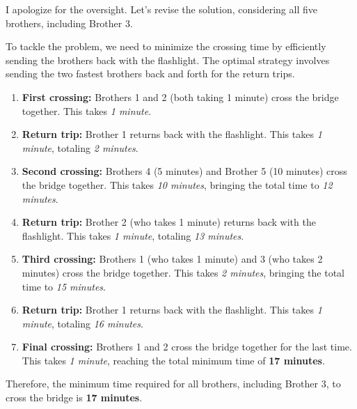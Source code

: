 \begin{airesult}
I apologize for the oversight. Let's revise the solution, considering all five
brothers, including Brother 3.

\vsp

To tackle the problem, we need to minimize the crossing time by efficiently
sending the brothers back with the flashlight. The optimal strategy involves
sending the two fastest brothers back and forth for the return trips.

\vsp

\begin{enumerate}
  \item \textbf{First crossing:} Brothers 1 and 2 (both taking 1 minute) cross
the bridge together. This takes \textit{1 minute}.
  \item \textbf{Return trip:} Brother 1 returns back with the flashlight. This
takes \textit{1 minute}, totaling \textit{2 minutes}.
  \item \textbf{Second crossing:} Brothers 4 (5 minutes) and Brother 5 (10
minutes) cross the bridge together. This takes \textit{10 minutes}, bringing the
total time to \textit{12 minutes}.
  \item \textbf{Return trip:} Brother 2 (who takes 1 minute) returns back with
the flashlight. This takes \textit{1 minute}, totaling \textit{13 minutes}.
  \item \textbf{Third crossing:} Brothers 1 (who takes 1 minute) and 3 (who
takes 2 minutes) cross the bridge together. This takes \textit{2 minutes},
bringing the total time to \textit{15 minutes}.
  \item \textbf{Return trip:} Brother 1 returns back with the flashlight. This
takes \textit{1 minute}, totaling \textit{16 minutes}.
  \item \textbf{Final crossing:} Brothers 1 and 2 cross the bridge together for
the last time. This takes \textit{1 minute}, reaching the total minimum time of
\textbf{17 minutes}.
\end{enumerate}

\vsp

Therefore, the minimum time required for all brothers, including Brother 3, to
cross the bridge is \textbf{17 minutes}.
\end{airesult}

\vsp
\vsp
\vsp
